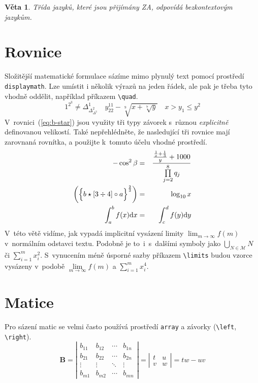 \documentclass[a4paper, twocolumn, 11pt]{article}
\theoremstyle{plain}
\newtheorem{theorem}{Věta}
\begin{document}
\begin{theorem}

	Třída jazyků, které jsou přijímány ZA, odpovídá \emph{bezkontextovým jazykům.}

\end{theorem}

\section{Rovnice}

Složitější matematické formulace sázíme mimo plynulý text pomocí prostředí \texttt{displaymath}.
Lze umístit i několik výrazů na jeden řádek, ale pak je třeba tyto vhodně oddělit,
například příkazem \verb|\quad|.
%
\begin{displaymath}
	1^{2^3} \neq \Delta^1_{\Delta^2_{\Delta^3}} \quad
	y_{22}^{11} - \sqrt[9]{x + \sqrt[7]{y}} \quad
	x > y_1 \leq y^2
\end{displaymath}
%
\noindent
V~rovnici~(\ref{eq:b-star}) jsou využity tři typy závorek s~různou \emph{explicitně} definovanou
velikostí. Také nepřehlédněte, že nasledující tři rovnice mají zarovnaná rovnítka, a použijte
k~tomuto účelu vhodné prostředí.
%
\begin{eqnarray}
	- \cos^2 \beta & = & \frac{\frac{\frac{1}{x} + \frac{1}{3}}{y} + 1000}{\prod\limits_{j=2}^8 q_j} \\
	\label{eq:b-star} \biggl( {\Bigl\{ b \star \left[ 3 \div 4 \right] \circ a \Bigr\}}^{\frac{2}{3}} \biggr) & = & \log_{10} x \\
	\label{eq:integ} \int_{a}^{b} f(x) \mathrm{d}x & = & \int_{c}^{d} f(y) \mathrm{d}y
\end{eqnarray}
%
\noindent
V~této větě vidíme, jak vypadá implicitní vysázení limity $\lim_{m\to\infty}f(m)$
v~normálním odstavci textu. Podobně je to~i~s~dalšími symboly jako
$\bigcup_{N \in \mathcal{M}} N$ či $\sum_{i=1}^{m} x_{i}^{2}$.
S~vynucením méně úsporné sazby příkazem \verb|\limits| budou vzorce vysázeny v~podobě
$\lim\limits_{m\to\infty} f(m)$ a $\sum\limits_{i=1}^{m} x_{i}^{4}$.

\section{Matice}

Pro sázení matic se velmi často používá prostředí \texttt{array}
a závorky (\verb|\left|, \verb|\right|).
%
\begin{displaymath}
	\mathbf{B} = \left| \begin{array}{cccc}
		b_{11} & b_{12} & \cdots & b_{1n} \\
		b_{21} & b_{22} & \cdots & b_{2n} \\
		\vdots & \vdots & \ddots & \vdots \\
		b_{m1} & b_{m2} & \cdots & b_{mn}
	\end{array} \right|
	= \left| \begin{array}{cc}
		t & u \\
		v & w
	\end{array} \right|
	= tw - uv
\end{displaymath}
\end{document}
